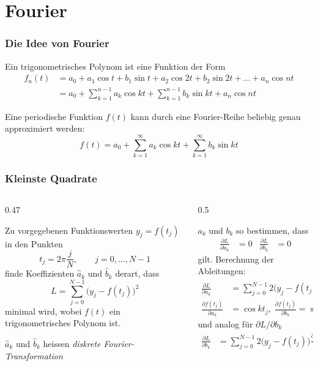 \section{Fourier}

%
%
\begin{frame}
\frametitle{Die Idee von Fourier}
\begin{trigopol}
Ein trigonometrisches Polynom ist eine Funktion der Form
\begin{align*}
f_n(t)
&=
a_0 + a_1\cos t+b_1\sin t + a_2\cos 2t + b_2\sin 2t + \dots + a_n\cos nt
\\
&=
a_0 + \sum_{k=1}^{n-1} a_k \cos kt + \sum_{k=1}^{n-1}b_k\sin kt
+ a_n\cos nt
\end{align*}
\end{trigopol}
\begin{fourier}
Eine periodische Funktion $f(t)$ kann durch eine Fourier-Reihe beliebig
genau approximiert werden:
\[
f(t)
=
a_0 + \sum_{k=1}^{\infty}  a_k \cos kt + \sum_{k=1}^{\infty}b_k\sin kt
\]
\end{fourier}
\end{frame}

%
%
\begin{frame}
\frametitle{Kleinste Quadrate}
\begin{columns}
\begin{column}{0.47\hsize}
\begin{leastsquares}
Zu vorgegebenen Funktionswerten $y_j=f(t_j)$ in den Punkten
\[
t_j = 2\pi \frac{j}{N},\qquad j=0,\dots,N-1
\]
finde Koeffizienten $\hat a_k$ und $\hat b_k$ derart, dass
\[
L=\sum_{j=0}^{N-1} \bigl(y_j - f(t_j)\bigr)^2
\]
minimal wird, wobei $f(t)$ ein trigonometrisches Polynom ist.
\end{leastsquares}
$\hat{a}_k$ und $\hat{b}_k$ heissen {\em diskrete Fourier-Transformation}
\end{column}
\begin{column}{0.5\hsize}
\begin{loesung}
$a_k$ und $b_k$ so bestimmen, dass
\begin{align*}
\frac{\partial L}{\partial a_k}&=0&
\frac{\partial L}{\partial b_k}&=0
\end{align*}
gilt.
Berechnung der Ableitungen:
\begin{align*}
\frac{\partial L}{\partial a_k}
&=
\sum_{j=0}^{N-1}2\bigl(y_j-f(t_j)\bigr)
\frac{\partial f(t_j)}{\partial a_k}
\\
\frac{\partial f(t_j)}{\partial a_k}
&=
\cos kt_j
,\;
\frac{\partial f(t_j)}{\partial b_k}
=
\sin kt_j
\end{align*}
und analog für $\partial L/\partial b_k$
\begin{align*}
\frac{\partial L}{\partial b_k}
&=
\sum_{j=0}^{N-1}2\bigl(y_j-f(t_j)\bigr)
\frac{\partial f(t_j)}{\partial b_k}
\end{align*}
\end{loesung}
\end{column}
\end{columns}
\end{frame}

